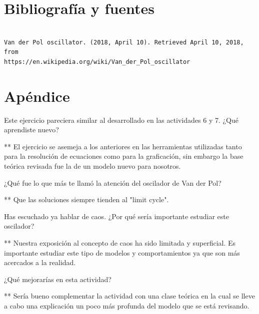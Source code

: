 \documentclass{article} %
\begin{document}
\section*{Bibliografía y fuentes}


\begin{verbatim} 

Van der Pol oscillator. (2018, April 10). Retrieved April 10, 2018, from
https://en.wikipedia.org/wiki/Van_der_Pol_oscillator 

\end{verbatim}


\section*{Apéndice}

\hspace{0.5 cm} Este ejercicio pareciera similar al desarrollado en las actividades 6 y 7. ¿Qué aprendiste nuevo?

\vspace{0.5 cm}

** El ejercicio se asemeja a los anteriores en las herramientas utilizadas tanto para la resolución de ecuaciones como para la graficación, sin embargo la base teórica revisada fue la de un modelo nuevo para nosotros. 

\vspace{0.5 cm}

¿Qué fue lo que más te llamó la atención del oscilador de Van der Pol?

\vspace{0.5 cm}

** Que las soluciones siempre tienden al "limit cycle".

\vspace{0.5 cm}

Has escuchado ya hablar de caos. ¿Por qué sería importante estudiar este oscilador?
 
\vspace{0.5 cm}

** Nuestra exposición al concepto de caos ha sido limitada y superficial. Es importante estudiar este tipo de modelos y comportamientos ya que son más acercados a la realidad. 

\vspace{0.5 cm}

¿Qué mejorarías en esta actividad?

\vspace{0.5 cm}

** Sería bueno complementar la actividad con una clase teórica en la cual se lleve a cabo una explicación un poco más profunda del modelo que se está revisando. 
\end{document}
